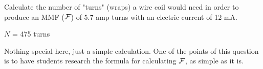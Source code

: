 

Calculate the number of "turns" (wraps) a wire coil would need in order to produce an MMF ($\cal F$) of 5.7 amp-turns with an electric current of 12 mA.







$N$ = 475 turns







Nothing special here, just a simple calculation.  One of the points of this question is to have students research the formula for calculating $\cal F$, as simple as it is.




